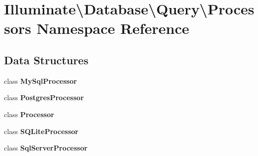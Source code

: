 \section{Illuminate\textbackslash{}Database\textbackslash{}Query\textbackslash{}Processors Namespace Reference}
\label{namespace_illuminate_1_1_database_1_1_query_1_1_processors}
\subsection*{Data Structures}
\begin{DoxyCompactItemize}
\item 
class {\bf My\+Sql\+Processor}
\item 
class {\bf Postgres\+Processor}
\item 
class {\bf Processor}
\item 
class {\bf S\+Q\+Lite\+Processor}
\item 
class {\bf Sql\+Server\+Processor}
\end{DoxyCompactItemize}
